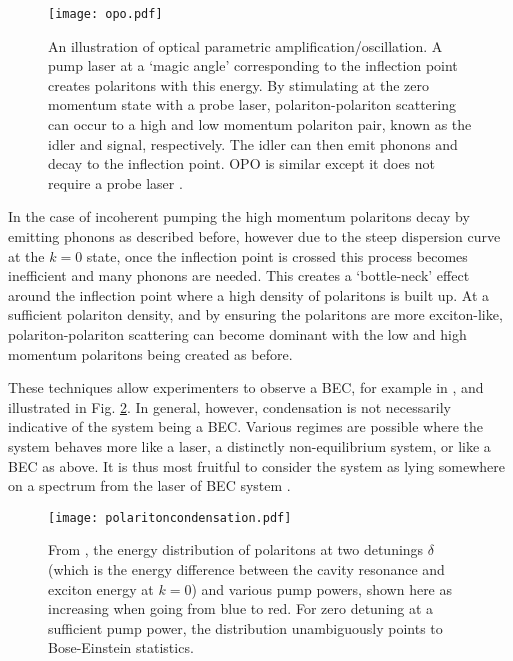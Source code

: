 \documentclass[letterpaper, 10 pt, conference]{IEEEtran}  %
\newcommand{\fig}[1]{Fig. #1}
\begin{document}
\begin{figure}[htbp!]
	\centering
	\texttt{[image: opo.pdf]}
	\caption{An illustration of optical parametric amplification/oscillation. A pump laser at a `magic angle' corresponding to the inflection point creates polaritons with this energy. 
	By stimulating at the zero momentum state with a probe laser, polariton-polariton scattering can occur to a high and low momentum polariton pair, known as the idler and signal, respectively. 
The idler can then emit phonons and decay to the inflection point.
	OPO is similar except it does not require a probe laser \cite{doi:10.1080/00107514.2010.550120}.}
	\label{fig:opo}
\end{figure}

In the case of incoherent pumping the high momentum polaritons decay by emitting phonons as described before, however due to the steep dispersion curve at the $k=0$ state, once the inflection point is crossed this process becomes inefficient and many phonons are needed. 
This creates a `bottle-neck' effect around the inflection point where a high density of polaritons is built up. 
At a sufficient polariton density, and by ensuring the polaritons are more exciton-like, polariton-polariton scattering can become dominant with the low and high momentum polaritons being created as before. 

These techniques allow experimenters to observe a BEC, for example in \cite{PhysRevLett.118.016602}, and illustrated in \fig{\ref{fig:polariton-condesation}}. 
In general, however, condensation is not necessarily indicative of the system being a BEC. 
Various regimes are possible where the system behaves more like a laser, a distinctly non-equilibrium system, or like a BEC as above.
It is thus most fruitful to consider the system as lying somewhere on a spectrum from the laser of BEC system \cite{Byrnes2014}. 

\begin{figure}[htbp!]
	\centering
	\texttt{[image: polaritoncondensation.pdf]}
	\caption{From \cite{PhysRevLett.118.016602}, the energy distribution of polaritons at two detunings $\delta$ (which is the energy difference between the cavity resonance and exciton energy at $k=0$) and various pump powers, shown here as increasing when going from blue to red. For zero detuning at a sufficient pump power, the distribution unambiguously points to Bose-Einstein statistics.}
	\label{fig:polariton-condesation}
\end{figure}
\end{document}
